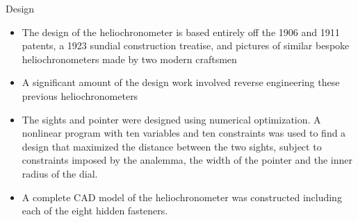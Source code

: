 \documentclass[final]{beamer}
\begin{document}
\begin{frame}
\begin{columns}[t]
\begin{column}[t]{0.24 \textwidth}
\alert{Design}

\begin{itemize}
\item The design of the heliochronometer is based entirely off the
1906 and 1911 patents, a 1923 sundial construction treatise, and
pictures of similar bespoke heliochronometers made by two modern
craftsmen
\item A significant amount of the design work involved reverse
engineering these previous heliochronometers
\item The sights and pointer were designed using numerical
  optimization. A nonlinear program with ten variables and ten
  constraints was used to find a design that maximized the distance
  between the two sights, subject to constraints imposed by the 
  analemma, the width of the pointer and the inner radius of the dial.
\item A complete CAD model of the heliochronometer was constructed 
including each of the eight hidden fasteners.
\begin{center}

\end{center}
\end{itemize}
\end{column}
\end{columns}
\end{frame}
\end{document}
